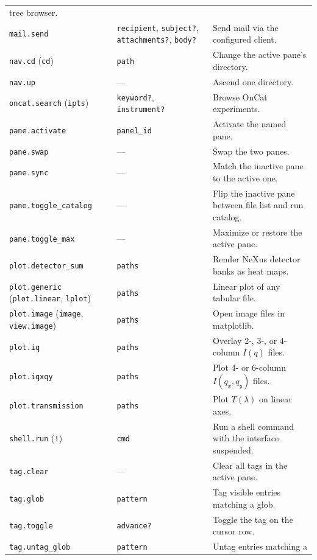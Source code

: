 \documentclass[tm]{ornltm}
\begin{document}
\begin{small}
\begin{longtable}{p{} p{} p{}}
    tree browser. \\
  \texttt{mail.send} & \texttt{recipient}, \texttt{subject?},
    \texttt{attachments?}, \texttt{body?} & Send mail via the configured
    client. \\
  \texttt{nav.cd} (\texttt{cd}) & \texttt{path} & Change the active pane's
    directory. \\
  \texttt{nav.up} & --- & Ascend one directory. \\
  \texttt{oncat.search} (\texttt{ipts}) & \texttt{keyword?},
    \texttt{instrument?} & Browse OnCat experiments. \\
  \texttt{pane.activate} & \texttt{panel\_id} & Activate the named pane. \\
  \texttt{pane.swap} & --- & Swap the two panes. \\
  \texttt{pane.sync} & --- & Match the inactive pane to the active one. \\
  \texttt{pane.toggle\_catalog} & --- & Flip the inactive pane between file list
    and run catalog. \\
  \texttt{pane.toggle\_max} & --- & Maximize or restore the active pane. \\
  \texttt{plot.detector\_sum} & \texttt{paths} & Render NeXus detector banks as
    heat maps. \\
  \texttt{plot.generic} (\texttt{plot.linear}, \texttt{lplot}) &
    \texttt{paths} & Linear plot of any tabular file. \\
  \texttt{plot.image} (\texttt{image}, \texttt{view.image}) & \texttt{paths} &
    Open image files in matplotlib. \\
  \texttt{plot.iq} & \texttt{paths} & Overlay 2-, 3-, or 4-column $I(q)$
    files. \\
  \texttt{plot.iqxqy} & \texttt{paths} & Plot 4- or 6-column
    $I(q_x,q_y)$ files. \\
  \texttt{plot.transmission} & \texttt{paths} & Plot $T(\lambda)$ on linear
    axes. \\
  \texttt{shell.run} (\texttt{!}) & \texttt{cmd} & Run a shell command with the
    interface suspended. \\
  \texttt{tag.clear} & --- & Clear all tags in the active pane. \\
  \texttt{tag.glob} & \texttt{pattern} & Tag visible entries matching a
    glob. \\
  \texttt{tag.toggle} & \texttt{advance?} & Toggle the tag on the cursor
    row. \\
  \texttt{tag.untag\_glob} & \texttt{pattern} & Untag entries matching a

\end{longtable}
\end{small}
\end{document}
